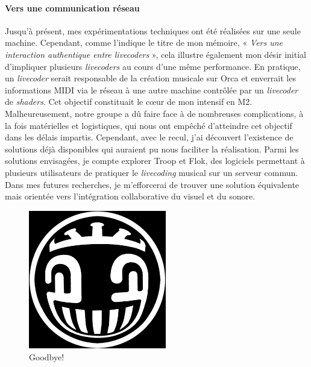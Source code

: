 \paragraph*{Vers une communication réseau}

Jusqu'à présent, mes expérimentations techniques ont été réalisées sur une seule machine. Cependant, comme l'indique le titre de mon mémoire, « \textit{Vers une interaction authentique entre livecoders} », cela illustre également mon désir initial d'impliquer plusieurs \textit{livecoders} au cours d'une même performance. En pratique, un \textit{livecoder} serait responsable de la création musicale sur Orca et enverrait les informations MIDI via le réseau à une autre machine contrôlée par un \textit{livecoder} de \textit{shaders}. Cet objectif constituait le cœur de mon intensif en M2. Malheureusement, notre groupe a dû faire face à de nombreuses complications, à la fois matérielles et logistiques, qui nous ont empêché d'atteindre cet objectif dans les délais impartis. Cependant, avec le recul, j'ai découvert l'existence de solutions déjà disponibles qui auraient pu nous faciliter la réalisation. Parmi les solutions envisagées, je compte explorer Troop et Flok, des logiciels permettant à plusieurs utilisateurs de pratiquer le \textit{livecoding} musical sur un serveur commun. 
Dans mes futures recherches, je m'efforcerai de trouver une solution équivalente mais orientée vers l'intégration collaborative du visuel et du sonore.

\newpage
\begin{figure}[h]
    \centering
    \includegraphics[width=6cm]{images/conclusion/stribe.png}
    \caption{Goodbye!}
    \label{stribe00}
\end{figure}




